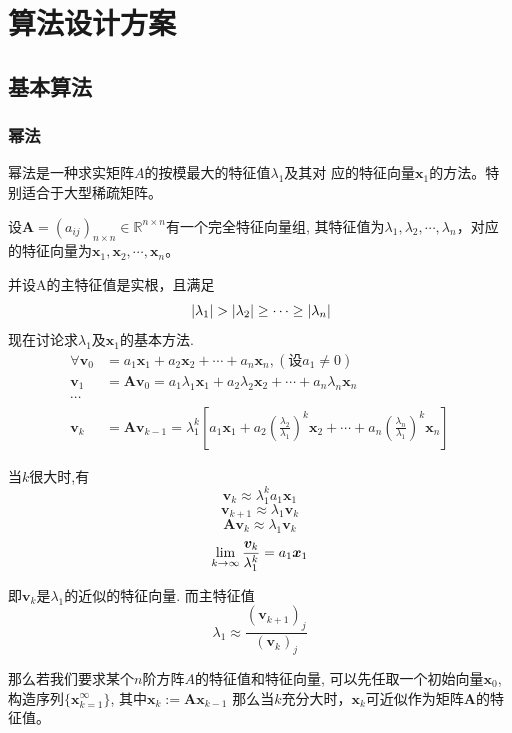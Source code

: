 \chapter{算法设计方案}
\section{基本算法}
\subsection{幂法}
幂法是一种求实矩阵$A$的按模最大的特征值$\lambda_1$及其对
应的特征向量$\bm{x}_1$的方法。特别适合于大型稀疏矩阵。

设${\bm{A}} = {({a_{ij}})_{n \times n}} \in {\mathbb{R}^{n \times n}}$有一个完全特征向量组, 其特征值为${\lambda _1},{\lambda _2}, \cdots ,{\lambda _n}$，对应的特征向量为${\bm{x}_1},{{\bm{x}}_2}, \cdots ,{{\bm{x}}_n}$。

并设A的主特征值是实根，且满足
\[{\rm{  }}\left| {{\lambda _1}} \right| > \left| {{\lambda _2}} \right| \ge  \cdots  \ge \left| {{\lambda _n}} \right|\]
现在讨论求$\lambda _1$及$\bm{x}_1$的基本方法.
\begin{align*}
\forall {{\bm{v}}_0} &= {a_1}{{\bm{x}}_1} + {a_2}{{\bm{x}}_2} +  \cdots  + {a_n}{{\bm{x}}_n},
(设{a_1} \ne 0)\\
{{\bm{v}}_1} &= {\bm{A}}{{\bm{v}}_0} = {a_1}{\lambda _1}{{\bm{x}}_1} + {a_2}{\lambda _2}{{\bm{x}}_2} +  \cdots  + {a_n}{\lambda _n}{{\bm{x}}_n}\\
\cdots\\
{{\bm{v}}_k} &= {\bm{A}}{{\bm{v}}_{k - 1}} = \lambda _1^k\left[ {{a_1}{{\bm{x}}_1} + {a_2}{{\left( {\frac{{{\lambda _2}}}{{{\lambda _1}}}} \right)}^k}{{\bm{x}}_2} +  \cdots  + {a_n}{{\left( {\frac{{{\lambda _n}}}{{{\lambda _1}}}} \right)}^k}{\bm{x}_n}} \right]
\end{align*}

当$k$很大时,有
\[{{\bm{v}}_k} \approx \lambda _1^k{a_1}{{\bm{x}}_1}\]
\[{{\bm{v}}_{k + 1}} \approx {\lambda _1}{{\bm{v}}_k}\]
\[{\bm{A}}{{\bm{v}}_k} \approx {\lambda _1}{{\bm{v}}_k}\]
\[\mathop {{\rm{lim}}}\limits_{k \to \infty } \dfrac{{{{\bm{v}}_k}}}{{\lambda _1^k}} = {a_1}{{\bm{x}}_1}
\]

即$\bm{v}_k$是$\lambda_1$的近似的特征向量.
而主特征值
\[{\lambda _1} \approx \dfrac{{{{({{\bm{v}}_{k + 1}})}_j}}}{{{{({{\bm{v}}_k})}_j}}}\]

那么若我们要求某个$n$阶方阵$A$的特征值和特征向量,
可以先任取一个初始向量$\bm{x}_0$,
构造序列$\{\bm{x}_{k=1}^{\infty}\}$,
其中$\bm{x}_k:=\bm{A}\bm{x}_{k-1}$
那么当$k$充分大时，$\bm{x}_k$可近似作为矩阵$\bm{A}$的特征值。

